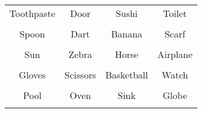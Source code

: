 \documentclass[12pt,a4paper]{article}
\begin{document}
\thispagestyle{empty}
\begin{table}[]
\centering
\Huge
\begin{tabular}{cccc}
 Toothpaste& Door& Sushi& Toilet\\  & & & \\
 Spoon& Dart& Banana& Scarf\\  & & & \\
 Sun& Zebra& Horse& Airplane\\  & & & \\
 Gloves& Scissors& Basketball& Watch\\  & & & \\
 Pool& Oven& Sink& Globe\\  & & & \\
\end{tabular}
\end{table}
\end{document}
